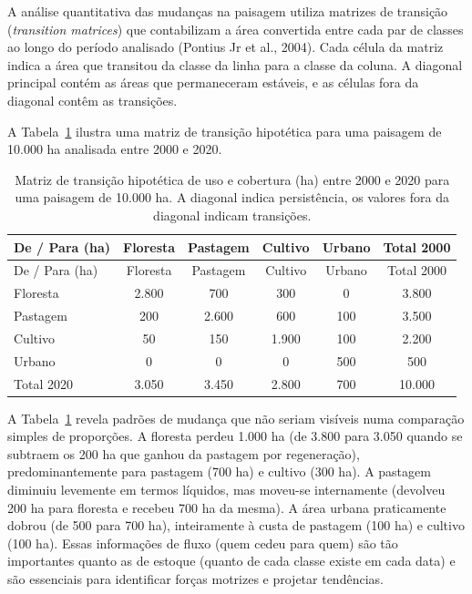 \documentclass[
  portuguese,
  11pt,
  a4paper,
  open=any]{scrbook}
\begin{document}
A análise quantitativa das mudanças na paisagem utiliza matrizes de
transição (\emph{transition matrices}) que contabilizam a área
convertida entre cada par de classes ao longo do período analisado
(Pontius Jr et al., 2004). Cada célula da matriz indica a área que
transitou da classe da linha para a classe da coluna. A diagonal
principal contém as áreas que permaneceram estáveis, e as células fora
da diagonal contêm as transições.

A Tabela~\ref{tbl-transicao} ilustra uma matriz de transição hipotética
para uma paisagem de 10.000 ha analisada entre 2000 e 2020.

\begin{longtable}[]{@{}lccccc@{}}
\caption{Matriz de transição hipotética de uso e cobertura (ha) entre
2000 e 2020 para uma paisagem de 10.000 ha. A diagonal indica
persistência, os valores fora da diagonal indicam
transições.}\label{tbl-transicao}\tabularnewline
\toprule\noalign{}
De / Para (ha) & Floresta & Pastagem & Cultivo & Urbano & Total 2000 \\
\midrule\noalign{}
\endfirsthead
\toprule\noalign{}
De / Para (ha) & Floresta & Pastagem & Cultivo & Urbano & Total 2000 \\
\midrule\noalign{}
\endhead
\bottomrule\noalign{}
\endlastfoot
Floresta & 2.800 & 700 & 300 & 0 & 3.800 \\
Pastagem & 200 & 2.600 & 600 & 100 & 3.500 \\
Cultivo & 50 & 150 & 1.900 & 100 & 2.200 \\
Urbano & 0 & 0 & 0 & 500 & 500 \\
Total 2020 & 3.050 & 3.450 & 2.800 & 700 & 10.000 \\
\end{longtable}

A Tabela~\ref{tbl-transicao} revela padrões de mudança que não seriam
visíveis numa comparação simples de proporções. A floresta perdeu 1.000
ha (de 3.800 para 3.050 quando se subtraem os 200 ha que ganhou da
pastagem por regeneração), predominantemente para pastagem (700 ha) e
cultivo (300 ha). A pastagem diminuiu levemente em termos líquidos, mas
moveu-se internamente (devolveu 200 ha para floresta e recebeu 700 ha da
mesma). A área urbana praticamente dobrou (de 500 para 700 ha),
inteiramente à custa de pastagem (100 ha) e cultivo (100 ha). Essas
informações de fluxo (quem cedeu para quem) são tão importantes quanto
as de estoque (quanto de cada classe existe em cada data) e são
essenciais para identificar forças motrizes e projetar tendências.
\end{document}
